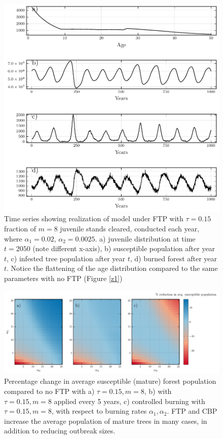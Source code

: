 \begin{figure}
  \includegraphics[width=\textwidth]{chapter_3/z1_ftp.pdf}
  \caption{Time series showing realization of model under FTP with $\tau = 0.15$ fraction of $m = 8$ juvenile stands cleared, conducted each year, where  $\alpha_1 = 0.02$, $\alpha_2 = 0.0025$.  a) juvenile distribution at time $t=2050$ (note different x-axis), b) susceptible population after year $t$, c) infested tree population after year $t$, d) burned forest after year $t$.  Notice the flattening of the age distribution compared to the same parameters with no FTP (Figure \ref{z1})}
  \label{trim_ts}
\end{figure}

\begin{figure}
  \includegraphics[width=\textwidth]{chapter_3/a1_a2_trim_susceptible_loss.pdf}
  \caption{Percentage change in average susceptible (mature) forest population compared to no FTP with a) $\tau = 0.15, m = 8$, b) with $\tau = 0.15, m = 8$ applied every 5 years, c) controlled burning with $\tau = 0.15, m = 8$,  with respect to burning rates $\alpha_1,\alpha_2$. FTP and CBP increase the average population of mature trees in many cases, in addition to reducing outbreak sizes.}
  \label{trim_susceptible}
\end{figure}

